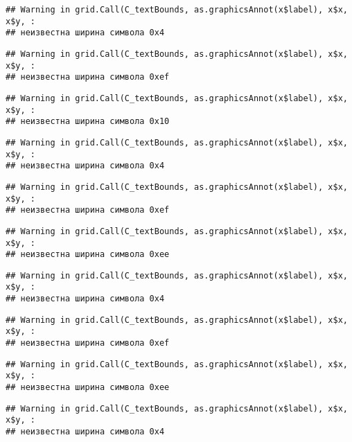 \documentclass[
]{article}
\begin{document}
\begin{verbatim}
## Warning in grid.Call(C_textBounds, as.graphicsAnnot(x$label), x$x, x$y, :
## неизвестна ширина символа 0x4
\end{verbatim}

\begin{verbatim}
## Warning in grid.Call(C_textBounds, as.graphicsAnnot(x$label), x$x, x$y, :
## неизвестна ширина символа 0xef
\end{verbatim}

\begin{verbatim}
## Warning in grid.Call(C_textBounds, as.graphicsAnnot(x$label), x$x, x$y, :
## неизвестна ширина символа 0x10
\end{verbatim}

\begin{verbatim}
## Warning in grid.Call(C_textBounds, as.graphicsAnnot(x$label), x$x, x$y, :
## неизвестна ширина символа 0x4
\end{verbatim}

\begin{verbatim}
## Warning in grid.Call(C_textBounds, as.graphicsAnnot(x$label), x$x, x$y, :
## неизвестна ширина символа 0xef
\end{verbatim}

\begin{verbatim}
## Warning in grid.Call(C_textBounds, as.graphicsAnnot(x$label), x$x, x$y, :
## неизвестна ширина символа 0xee
\end{verbatim}

\begin{verbatim}
## Warning in grid.Call(C_textBounds, as.graphicsAnnot(x$label), x$x, x$y, :
## неизвестна ширина символа 0x4
\end{verbatim}

\begin{verbatim}
## Warning in grid.Call(C_textBounds, as.graphicsAnnot(x$label), x$x, x$y, :
## неизвестна ширина символа 0xef
\end{verbatim}

\begin{verbatim}
## Warning in grid.Call(C_textBounds, as.graphicsAnnot(x$label), x$x, x$y, :
## неизвестна ширина символа 0xee
\end{verbatim}

\begin{verbatim}
## Warning in grid.Call(C_textBounds, as.graphicsAnnot(x$label), x$x, x$y, :
## неизвестна ширина символа 0x4
\end{verbatim}
\end{document}
